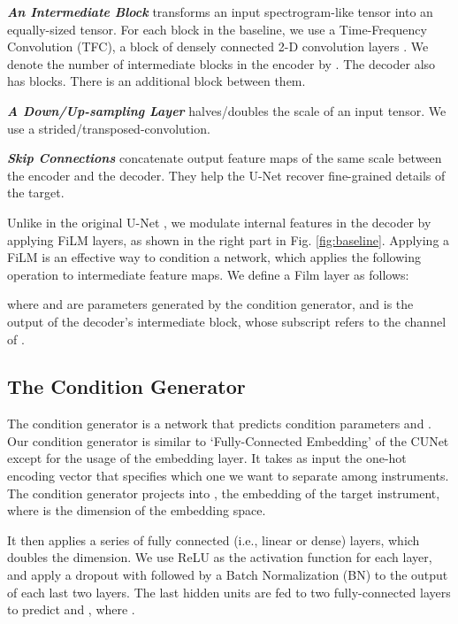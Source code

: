 \documentclass{article}
\begin{document}
\noindent
\textbf{\textit{An Intermediate Block}} transforms an input spectrogram-like tensor into an equally-sized tensor.
For each block in the baseline, we use a Time-Frequency Convolution \cite{tfctdf} (TFC), a block of densely connected 2-D convolution layers \cite{densenet}.
We denote the number of intermediate blocks in the encoder by . The decoder also has  blocks. There is an additional block between them. 

\noindent
\textbf{\textit{A Down/Up-sampling Layer}} halves/doubles the scale of an input tensor. We use a strided/transposed-convolution.

\noindent
\textbf{\textit{Skip Connections}} concatenate output feature maps of the same scale between the encoder and the decoder. They help the U-Net recover fine-grained details of the target.

Unlike in the original U-Net \cite{tfctdf}, we modulate internal features in the decoder by applying FiLM layers, as shown in the right part in Fig. \ref{fig:baseline}.
Applying a FiLM is an effective way to condition a network, which applies the following operation to intermediate feature maps.
We define a Film layer as follows:



\noindent
where  and  are parameters generated by the condition generator, and  is the output of the  decoder's intermediate block, whose subscript refers to the  channel of . 










\subsection{The Condition Generator}

The condition generator is a network that predicts condition parameters  and . 
Our condition generator is similar to `Fully-Connected Embedding' of the  CUNet \cite{cunet} except for the usage of the embedding layer. 
It takes as input the one-hot encoding vector  that specifies which one we want to separate among  instruments. The condition generator projects  into , the embedding of the target instrument, where  is the dimension of the embedding space. 

It then applies a series of fully connected (i.e., linear or dense) layers, which doubles the dimension. We use ReLU \cite{relu} as the activation function for each layer, and apply a dropout with  followed by a Batch Normalization (BN) \cite{bn} to the output of each last two layers.
The last hidden units are fed to two fully-connected layers to predict  and , where .
\end{document}
